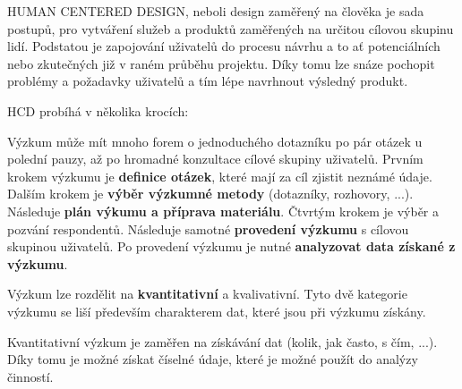 
HUMAN CENTERED DESIGN, neboli design zaměřený na člověka je sada postupů, pro vytváření služeb a produktů zaměřených na určitou cílovou skupinu lidí. Podstatou je zapojování uživatelů do procesu návrhu a to ať potenciálních nebo zkutečných již v raném průběhu projektu. Díky tomu lze snáze pochopit problémy a požadavky uživatelů a tím lépe navrhnout výsledný produkt.


HCD probíhá v několika krocích:

\vskip 4mm
\vskip 4mm


Výzkum může mít mnoho forem o jednoduchého dotazníku po pár otázek u polední pauzy, až po hromadné konzultace cílové skupiny uživatelů. Prvním krokem výzkumu je {\bf definice otázek}, které mají za cíl zjistit neznámé údaje. Dalším krokem je {\bf výběr výzkumné metody} (dotazníky, rozhovory, ...). Následuje {\bf plán výkumu a příprava materiálu}. Čtvrtým krokem je výběr a pozvání respondentů. Následuje samotné {\bf provedení výzkumu} s cílovou skupinou uživatelů. Po provedení výzkumu je nutné {\bf analyzovat data získané z výzkumu}.

Výzkum lze rozdělit na {\bf kvantitativní} a {kvalivativní}. Tyto dvě kategorie výzkumu se liší především charakterem dat, které jsou při výzkumu získány. 

Kvantitativní výzkum je zaměřen na získávání dat (kolik, jak často, s čím, ...). Díky tomu je možné získat číselné údaje, které je možné použít do analýzy činností.

